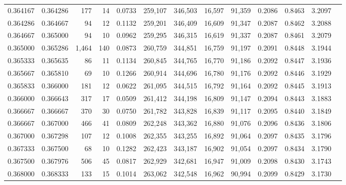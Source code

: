 \begin{tabular}{rrrrrrrrrrrrr}
0.364167 & 0.364286 &   177 &  14 &                                     0.0733 & 259,107 & 346,503 &  16,597 &  91,359 & 0.2086 & 0.8463 & 3.2097 \\
0.364286 & 0.364667 &    94 &  12 &                                     0.1132 & 259,201 & 346,409 &  16,609 &  91,347 & 0.2087 & 0.8462 & 3.2088 \\
0.364667 & 0.365000 &    94 &  10 &                                     0.0962 & 259,295 & 346,315 &  16,619 &  91,337 & 0.2087 & 0.8461 & 3.2079 \\
0.365000 & 0.365286 & 1,464 & 140 &                                     0.0873 & 260,759 & 344,851 &  16,759 &  91,197 & 0.2091 & 0.8448 & 3.1944 \\
0.365333 & 0.365635 &    86 &  11 &                                     0.1134 & 260,845 & 344,765 &  16,770 &  91,186 & 0.2092 & 0.8447 & 3.1936 \\
0.365667 & 0.365810 &    69 &  10 &                                     0.1266 & 260,914 & 344,696 &  16,780 &  91,176 & 0.2092 & 0.8446 & 3.1929 \\
0.365833 & 0.366000 &   181 &  12 &                                     0.0622 & 261,095 & 344,515 &  16,792 &  91,164 & 0.2092 & 0.8445 & 3.1913 \\
0.366000 & 0.366643 &   317 &  17 &                                     0.0509 & 261,412 & 344,198 &  16,809 &  91,147 & 0.2094 & 0.8443 & 3.1883 \\
0.366667 & 0.366667 &   370 &  30 &                                     0.0750 & 261,782 & 343,828 &  16,839 &  91,117 & 0.2095 & 0.8440 & 3.1849 \\
0.366667 & 0.367000 &   466 &  41 &                                     0.0809 & 262,248 & 343,362 &  16,880 &  91,076 & 0.2096 & 0.8436 & 3.1806 \\
0.367000 & 0.367298 &   107 &  12 &                                     0.1008 & 262,355 & 343,255 &  16,892 &  91,064 & 0.2097 & 0.8435 & 3.1796 \\
0.367333 & 0.367500 &    68 &  10 &                                     0.1282 & 262,423 & 343,187 &  16,902 &  91,054 & 0.2097 & 0.8434 & 3.1790 \\
0.367500 & 0.367976 &   506 &  45 &                                     0.0817 & 262,929 & 342,681 &  16,947 &  91,009 & 0.2098 & 0.8430 & 3.1743 \\
0.368000 & 0.368333 &   133 &  15 &                                     0.1014 & 263,062 & 342,548 &  16,962 &  90,994 & 0.2099 & 0.8429 & 3.1730 \\

\end{tabular}
